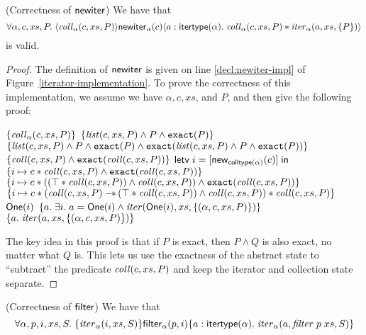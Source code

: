 \begin{lemma}{(Correctness of $\mathsf{newiter}$)}
We have that
\begin{displaymath}
\forall \alpha, c, xs, P.\; \langle{\mathit{coll}_\alpha(c, xs, P)}\rangle{\mathsf{newiter}_\alpha(c)}\langle{a:\mathsf{itertype}(\alpha)}.\;{\mathit{coll}_\alpha(c, xs, P) * 
                                  \mathit{iter}_\alpha(a, xs, \{{P}\})}\rangle
\end{displaymath}
is valid.
\end{lemma}

\begin{proof}
The definition of $\mathsf{newiter}$ is given on line \ref{decl:newiter-impl} of
Figure~\ref{iterator-implementation}. To prove the correctness of this
implementation, we assume we have $\alpha, c, xs$, and $P$, and then
give the following proof: 

\begin{specification}
\nextline $\{{\mathit{coll}_\alpha(c, xs, P)}\}$ 
\nextline $\{{\mathit{list}(c, xs, P) \land P \land \mathtt{exact}({P})}\}$ 
\nextline $\{{\mathit{list}(c, xs, P) \land P \land \mathtt{exact}({P})  \land \mathtt{exact}({\mathit{list}(c, xs, P) \land P \land \mathtt{exact}({P})})}\}$ 
\nextline $\{{\mathit{coll}(c, xs, P) \land \mathtt{exact}({\mathit{coll}(c, xs, P)})}\}$ 
\nextline $\mathsf{letv}\;i = [\mathsf{new}_{\mathsf{colltype}(\alpha)}(c)]\;\mathsf{in}\;$ 
\nextline $\{{i \mapsto c * \mathit{coll}(c, xs, P) \land \mathtt{exact}({\mathit{coll}(c, xs, P)})}\}$ 
\nextline $\{{i \mapsto c * ((\top * \mathit{coll}(c, xs, P)) \land \mathit{coll}(c, xs, P)) \land \mathtt{exact}({\mathit{coll}(c, xs, P)})}\}$ 
\nextline $\{{i \mapsto c * (\mathit{coll}(c, xs, P) -\!\!*\, (\top * \mathit{coll}(c, xs, P)) \land \mathit{coll}(c, xs, P)) * \mathit{coll}(c, xs, P)}\}$ 
\nextline $\mathsf{One}(i)$ 
\nextline $\{{a.\; \exists i.\; a = \mathsf{One}(i) \land \mathit{iter}(\mathsf{One}(i), xs, \{{(\alpha, c, xs, P)}\})}\}$ 
\nextline $\{{a.\; \mathit{iter}(a, xs, \{{(\alpha, c, xs, P)}\})}\}$ 

\end{specification}

The key idea in this proof is that if $P$ is exact, then $P \land Q$
is also exact, no matter what $Q$ is.  This lets us use the exactness
of the abstract state to ``subtract'' the predicate $\mathit{coll}(c, xs, P)$
and keep the iterator and collection state separate. 

\end{proof}

\begin{lemma}{(Correctness of $\mathsf{filter}$)}
We have that
\begin{displaymath}
  \forall \alpha, p, i, xs, S.\; \{{\mathit{iter}_\alpha(i, xs, S)}\}{\mathsf{filter}_\alpha(p, i)}\{{a:\mathsf{itertype}(\alpha)}.\;{\mathit{iter}_\alpha(a, \mathit{filter}\;p\;xs, S)}\}
\end{displaymath}
\end{lemma}

